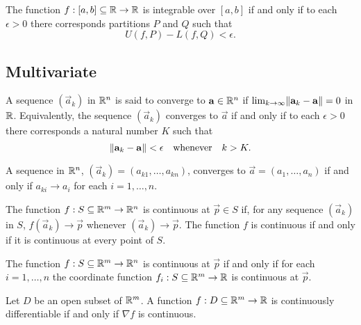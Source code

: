 \documentclass{article}
\begin{document}
\begin{theorem}
    The function ${f: [a, b] \subseteq \mathbb{R} \rightarrow \mathbb{R}}$ is integrable over
    $[a, b]$ if and only if to each $\epsilon > 0$ there corresponds
    partitions $P$ and $Q$ such that
    \begin{equation*}
        U(f, P) - L(f, Q) < \epsilon.
    \end{equation*}
\end{theorem}


\subsection{Multivariate}
\begin{definition}
    A sequence $(\vec{a}_k)$ in $\mathbb{R}^n$ is said to converge to $\mathbf{a} \in \mathbb{R}^n$
    if $\lim_{k \rightarrow \infty} \lVert\mathbf{a}_k - \mathbf{a}\rVert = 0$ in $\mathbb{R}$.
    Equivalently, the sequence $(\vec{a}_k)$ converges to $\vec{a}$ if and only if to
    each $\epsilon > 0$ there corresponds a natural number $K$ such that
    \begin{equation*}
        \lVert\mathbf{a}_k - \mathbf{a}\rVert < \epsilon \quad \textnormal{whenever} \quad k > K.
    \end{equation*}
\end{definition}

\begin{theorem}
    A sequence in $\mathbb{R}^n$, $(\vec{a}_k) = (a_{k1}, \ldots, a_{kn})$, converges to $\vec{a} = (a_1, \ldots, a_n)$ if and only if
    $a_{ki} \rightarrow a_i$ for each $i = 1,\ldots,n$.
\end{theorem}

\begin{definition}
    The function $f: S \subseteq \mathbb{R}^m \rightarrow \mathbb{R}^n$
    is continuous at $\vec{p} \in S$ if, for any sequence
    $(\vec{a}_k)$ in $S$, $f(\vec{a}_k) \rightarrow \vec{p}$ whenever
    $(\vec{a}_k) \rightarrow \vec{p}$. The function $f$ is continuous
    if and only if it is continuous at every point of $S$.
\end{definition}

\begin{theorem}
    The function $f: S \subseteq \mathbb{R}^m \rightarrow \mathbb{R}^n$
    is continuous at $\vec{p}$ if and only if for each $i=1, \ldots, n$ the coordinate function
    $f_i: S \subseteq \mathbb{R}^m \rightarrow \mathbb{R}$ is continuous at $\vec{p}$.
\end{theorem}

\begin{corollary}
    Let $D$ be an open subset of $\mathbb{R}^m$. A function $f: D \subseteq \mathbb{R}^m \rightarrow \mathbb{R}$
    is continuously differentiable if and only if $\nabla f$ is continuous.
\end{corollary}
\end{document}
